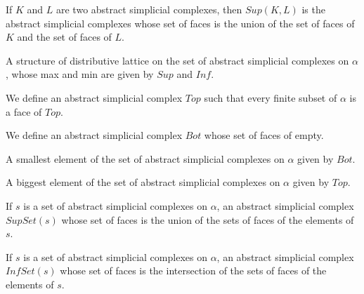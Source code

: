 \begin{subdefi}[Sup]
If $K$ and $L$ are two abstract simplicial complexes, then $Sup(K,L)$ is the abstract simplicial complexes whose set of faces is
the union of the set of faces of $K$ and the set of faces of $L$.

\end{subdefi}

\begin{subdefi}[DistribLattice]
A structure of distributive lattice on the set of abstract simplicial complexes on $\alpha$, whose max and min are given by $Sup$ and $Inf$.

\end{subdefi}

\begin{subdefi}[Top]
We define an abstract simplicial complex $Top$ such that every finite subset of $\alpha$ is a face of $Top$.

\end{subdefi}

\begin{subdefi}[Bot]
We define an abstract simplicial complex $Bot$ whose set of faces of empty.

\end{subdefi}

\begin{subdefi}[OrderBot]
A smallest element of the set of abstract simplicial complexes on $\alpha$ given by $Bot$.

\end{subdefi}

\begin{subdefi}[OrderTop]
A biggest element of the set of abstract simplicial complexes on $\alpha$ given by $Top$.

\end{subdefi}

\begin{subdefi}[SupSet]
If $s$ is a set of abstract simplicial complexes on $\alpha$, an abstract simplicial complex $SupSet(s)$ whose set of faces is the union
of the sets of faces of the elements of $s$.

\end{subdefi}

\begin{subdefi}[InfSet]
If $s$ is a set of abstract simplicial complexes on $\alpha$, an abstract simplicial complex $InfSet(s)$ whose set of faces is the intersection
of the sets of faces of the elements of $s$.

\end{subdefi}


